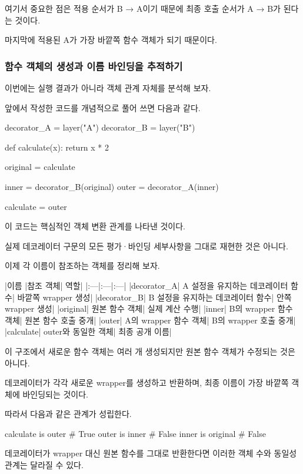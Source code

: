 여기서 중요한 점은 적용 순서가 B → A이기 때문에 최종 호출 순서가 A → B가 된다는 것이다.

마지막에 적용된 A가 가장 바깥쪽 함수 객체가 되기 때문이다.

\subsubsection{함수 객체의 생성과 이름 바인딩을 추적하기}

이번에는 실행 결과가 아니라 객체 관계 자체를 분석해 보자.

앞에서 작성한 코드를 개념적으로 풀어 쓰면 다음과 같다.

\begin{dhkcode}
decorator_A = layer("A")
decorator_B = layer("B")


def calculate(x):
    return x * 2


original = calculate

inner = decorator_B(original)
outer = decorator_A(inner)

calculate = outer
\end{dhkcode}

이 코드는 핵심적인 객체 변환 관계를 나타낸 것이다.

실제 데코레이터 구문의 모든 평가·바인딩 세부사항을 그대로 재현한 것은 아니다.

이제 각 이름이 참조하는 객체를 정리해 보자.

\begin{dhktable}
|이름	|참조 객체|	역할|
|:---|:---|:---|
|decorator_A|	A 설정을 유지하는 데코레이터 함수|	바깥쪽 wrapper 생성|
|decorator_B|	B 설정을 유지하는 데코레이터 함수|	안쪽 wrapper 생성|
|original|	원본 함수 객체|	실제 계산 수행|
|inner|	B의 wrapper 함수 객체|	원본 함수 호출 중개|
|outer|	A의 wrapper 함수 객체|	B의 wrapper 호출 중개|
|calculate|	outer와 동일한 객체|	최종 공개 이름|
\end{dhktable}

이 구조에서 새로운 함수 객체는 여러 개 생성되지만 원본 함수 객체가 수정되는 것은 아니다.

데코레이터가 각각 새로운 wrapper를 생성하고 반환하며, 최종 이름이 가장 바깥쪽 객체에 바인딩되는 것이다.

따라서 다음과 같은 관계가 성립한다.

\begin{dhkcode}
calculate is outer  # True
outer is inner       # False
inner is original    # False
\end{dhkcode}

데코레이터가 wrapper 대신 원본 함수를 그대로 반환한다면 이러한 객체 수와 동일성 관계는 달라질 수 있다.


